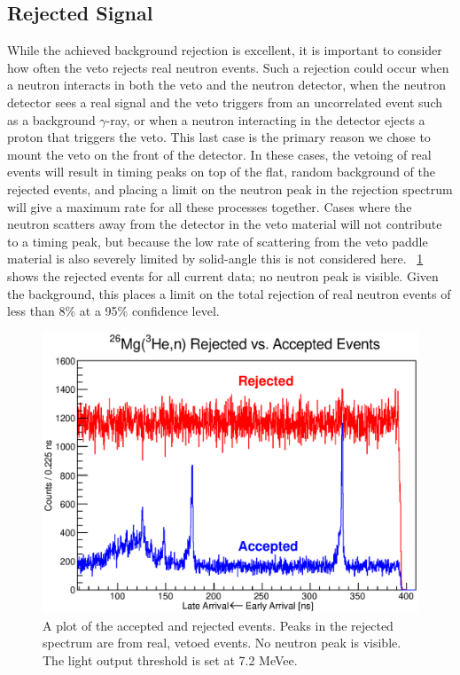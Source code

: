 \subsection{Rejected Signal}

While the achieved background rejection is excellent, it is important to consider how often the veto rejects real neutron events.  Such a rejection could occur when a neutron interacts in both the veto and the neutron detector, when the neutron detector sees a real signal and the veto triggers from an uncorrelated event such as a background $\gamma$-ray, or when a neutron interacting in the detector ejects a proton that triggers the veto.  This last case is the primary reason we chose to mount the veto on the front of the detector.    In these cases, the vetoing of real events will result in timing peaks on top of the flat, random background of the rejected events, and placing a limit on the neutron peak in the rejection spectrum will give a maximum rate for all these processes together.  Cases where the neutron scatters away from the detector in the veto material will not contribute to a timing peak, but because the low rate of scattering from the veto paddle material is also severely limited by solid-angle this is not considered here.  {\fig}~\ref{fig:rejectionTOF} shows the rejected events for all current  data; no neutron peak is visible.  Given the background, this places a limit on the total rejection of real neutron events of less than 8\% at a 95\% confidence level.  
\begin{figure}[!htbp]
\centering
\includegraphics[width=5in]{figures/26Mg_rejection_newEnergyCut.eps}
\caption[Placing a limit on real events rejected by the veto.]{\label{fig:rejection}A plot of the accepted and rejected events.  Peaks in the rejected spectrum are from real, vetoed events.  No neutron peak is visible.  The light output threshold is set at 7.2 MeVee.}
\label{fig:rejectionTOF}
\end{figure}

